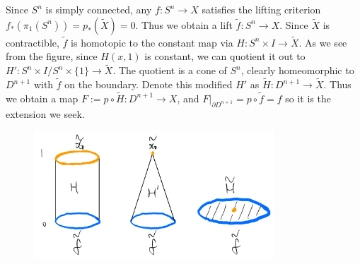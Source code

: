 \documentclass[12pt]{article}
\begin{document}
\begin{problem}[7]
Since $ S^{n}$ is simply connected, any $ f: S^{n} \to X$ satisfies the lifting criterion $ f_*( \pi_1(S^{n})) = p_*(\widetilde{ X}) = 0$. Thus we obtain a lift $ \widetilde{ f}: S^{n} \to X$. Since $ \widetilde{ X}$ is contractible, $ \widetilde{ f}$ is homotopic to the constant map via $ H: S^{n} \times I \to \widetilde{ X}$. As we see from the figure, since $ H(x,1)$ is constant, we can quotient it out to $ H':S^{n} \times I / S^{n} \times \{1\} \to \widetilde{ X}$. The quotient is a cone of $ S^{n}$, clearly homeomorphic to $ D^{n+1}$ with $ \widetilde{ f}$ on the boundary. Denote this modified $ H'$ as  $ \widetilde{ H}: D^{n+1} \to \widetilde{ X}$. Thus we obtain a map $ F:= p \circ \widetilde{ H} : D^{n+1} \to X$, and $ F|_{ \partial D^{n+1}} = p \circ \widetilde{ f} = f$ so it is the extension we seek.
~\begin{figure}[H]
	\centering
	\includegraphics[width=0.8\textwidth]{./figures/extension2.png}
	\caption{}
\end{figure}
\end{problem}
\end{document}
